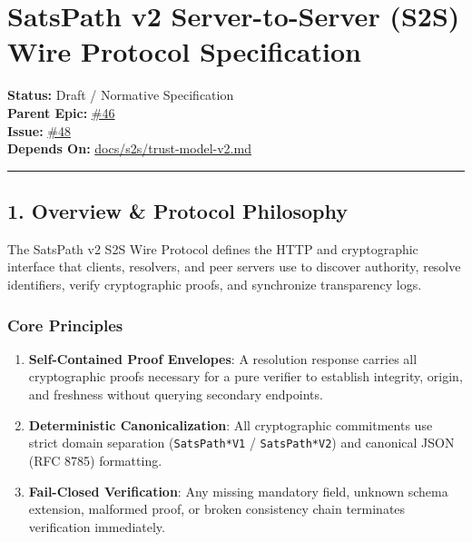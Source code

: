 \documentclass[
]{article}
\author{}
\date{}
\providecommand{\tightlist}{%
  \setlength{\itemsep}{0pt}\setlength{\parskip}{0pt}}
\begin{document}
\hypertarget{satspath-v2-server-to-server-s2s-wire-protocol-specification}{%
\section{SatsPath v2 Server-to-Server (S2S) Wire Protocol
Specification}\label{satspath-v2-server-to-server-s2s-wire-protocol-specification}}

\textbf{Status:} Draft / Normative Specification\\
\textbf{Parent Epic:}
\href{https://github.com/Truja503/satspath/issues/46}{\#46}\\
\textbf{Issue:}
\href{https://github.com/Truja503/satspath/issues/48}{\#48}\\
\textbf{Depends On:}
\href{file:///home/chelo/antigravity/PlanB/satspath/docs/s2s/trust-model-v2.md}{docs/s2s/trust-model-v2.md}

\begin{center}\rule{0.5\linewidth}{0.5pt}\end{center}

\hypertarget{overview-protocol-philosophy}{%
\subsection{1. Overview \& Protocol
Philosophy}\label{overview-protocol-philosophy}}

The SatsPath v2 S2S Wire Protocol defines the HTTP and cryptographic
interface that clients, resolvers, and peer servers use to discover
authority, resolve identifiers, verify cryptographic proofs, and
synchronize transparency logs.

\hypertarget{core-principles}{%
\subsubsection{Core Principles}\label{core-principles}}

\begin{enumerate}
\def\labelenumi{\arabic{enumi}.}
\tightlist
\item
  \textbf{Self-Contained Proof Envelopes}: A resolution response carries
  all cryptographic proofs necessary for a pure verifier to establish
  integrity, origin, and freshness without querying secondary endpoints.
\item
  \textbf{Deterministic Canonicalization}: All cryptographic commitments
  use strict domain separation (\texttt{SatsPath*V1} /
  \texttt{SatsPath*V2}) and canonical JSON (RFC 8785) formatting.
\item
  \textbf{Fail-Closed Verification}: Any missing mandatory field,
  unknown schema extension, malformed proof, or broken consistency chain
  terminates verification immediately.
\end{enumerate}
\end{document}
